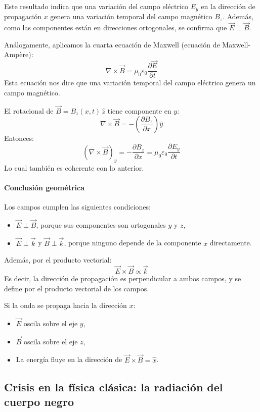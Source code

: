 Este resultado indica que una variación del campo eléctrico \(E_y\) en la dirección de propagación \(x\) genera una variación temporal del campo magnético \(B_z\). Además, como las componentes están en direcciones ortogonales, se confirma que \(\vec{E} \perp \vec{B}\).

Análogamente, aplicamos la cuarta ecuación de Maxwell (ecuación de Maxwell-Ampère):
\[
\nabla \times \vec{B} = \mu_0 \varepsilon_0 \frac{\partial \vec{E}}{\partial t}
\]
Esta ecuación nos dice que una variación temporal del campo eléctrico genera un campo magnético.

El rotacional de \(\vec{B} = B_z(x,t)\, \hat{z}\) tiene componente en \(y\):
\[
\nabla \times \vec{B} = -\left( \frac{\partial B_z}{\partial x} \right) \hat{y}
\]
Entonces:
\[
\left( \nabla \times \vec{B} \right)_y = -\frac{\partial B_z}{\partial x} = \mu_0 \varepsilon_0 \frac{\partial E_y}{\partial t}
\]
Lo cual también es coherente con lo anterior.

\paragraph{Conclusión geométrica}

Los campos cumplen las siguientes condiciones:
\begin{itemize}
  \item \(\vec{E} \perp \vec{B}\), porque sus componentes son ortogonales \(y\) y \(z\),
  \item \(\vec{E} \perp \vec{k}\) y \(\vec{B} \perp \vec{k}\), porque ninguno depende de la componente \(x\) directamente.
\end{itemize}
Además, por el producto vectorial:
\[
\vec{E} \times \vec{B} \propto \vec{k}
\]
Es decir, la dirección de propagación es perpendicular a ambos campos, y se define por el producto vectorial de los campos.

Si la onda se propaga hacia la dirección \(x\):
\begin{itemize}
  \item \(\vec{E}\) oscila sobre el eje \(y\),
  \item \(\vec{B}\) oscila sobre el eje \(z\),
  \item La energía fluye en la dirección de \(\vec{E} \times \vec{B} = \hat{x}\).
\end{itemize}

\subsection{Crisis en la física clásica: la radiación del cuerpo negro}

